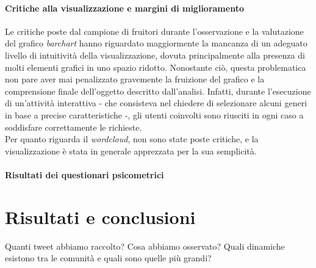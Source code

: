 \documentclass[12pt, a4paper, twocolumn]{article} %
\begin{document}
\subsection{Critiche alla visualizzazione e margini di miglioramento}
Le critiche poste dal campione di fruitori durante l'osservazione e la valutazione del grafico \textit{barchart} hanno riguardato maggiormente la mancanza di un adeguato livello di intuitività della visualizzazione, dovuta principalmente alla presenza di molti elementi grafici in uno spazio ridotto. 
Nonostante ciò, questa problematica non pare aver mai penalizzato gravemente la fruizione del grafico e la comprensione finale dell'oggetto descritto dall'analisi. 
Infatti, durante l'esecuzione di un'attività interattiva - che consisteva nel chiedere di selezionare alcuni generi in base a precise caratteristiche -, gli utenti coinvolti sono riusciti in ogni caso a soddisfare correttamente le richieste. \\
Per quanto riguarda il \textit{wordcloud}, non sono state poste critiche, e la visualizzazione è stata in generale apprezzata per la sua semplicità.

\subsection{Risultati dei questionari psicometrici}

\hfill
\newpage
\part{Risultati e conclusioni}
Quanti tweet abbiamo raccolto? Cosa abbiamo osservato? Quali dinamiche esistono tra le comunità e quali sono quelle più grandi?



\hfill
\newpage
\printbibliography[title={Bibliografia e sitografia}]

\end{document}
